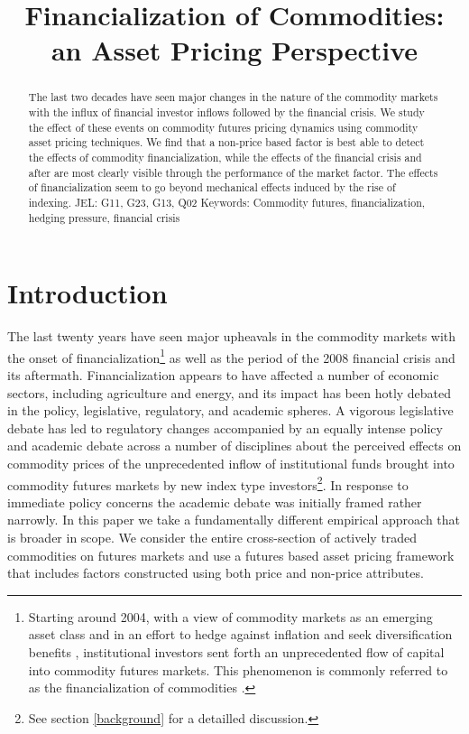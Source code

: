 \documentclass[12pt,]{article}
\title{Financialization of Commodities: an Asset Pricing Perspective}
\author{}
\date{}
\let\rmarkdownfootnote\footnote%
\def\footnote{\protect\rmarkdownfootnote}
\begin{document}
\maketitle
\begin{abstract}
The last two decades have seen major changes in the nature of the
commodity markets with the influx of financial investor inflows followed
by the financial crisis. We study the effect of these events on
commodity futures pricing dynamics using commodity asset pricing
techniques. We find that a non-price based factor is best able to detect
the effects of commodity financialization, while the effects of the
financial crisis and after are most clearly visible through the
performance of the market factor. The effects of financialization seem
to go beyond mechanical effects induced by the rise of indexing. 
\newline
JEL: G11, G23, G13, Q02
\newline
Keywords: Commodity futures, financialization, hedging pressure, financial crisis

\end{abstract}


\newpage

\hypertarget{introduction}{%
\section{Introduction}\label{introduction}}

The last twenty years have seen major upheavals in the commodity markets
with the onset of financialization\footnote{Starting around 2004, with a
  view of commodity markets as an emerging asset class and in an effort
  to hedge against inflation and seek diversification benefits
  \citep{buyuksahin_speculators_2014, singleton_investor_2013},
  institutional investors sent forth an unprecedented flow of capital
  into commodity futures markets. This phenomenon is commonly referred
  to as the financialization of commodities
  \citep{domanski_financial_2007}.} as well as the period of the 2008
financial crisis and its aftermath. Financialization appears to have
affected a number of economic sectors, including agriculture and energy,
and its impact has been hotly debated in the policy, legislative,
regulatory, and academic spheres. A vigorous legislative debate has led
to regulatory changes accompanied by an equally intense policy and
academic debate across a number of disciplines about the perceived
effects on commodity prices of the unprecedented inflow of institutional
funds brought into commodity futures markets by new index type
investors\footnote{See section \ref{background} for a detailled
  discussion.}. In response to immediate policy concerns the academic
debate was initially framed rather narrowly. In this paper we take a
fundamentally different empirical approach that is broader in scope. We
consider the entire cross-section of actively traded commodities on
futures markets and use a futures based asset pricing framework that
includes factors constructed using both price and non-price attributes.
\end{document}
